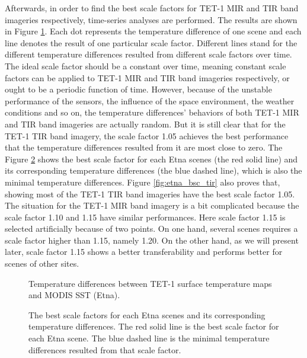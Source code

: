 \noindent Afterwards, in order to find the best scale factors for TET-1 MIR and TIR band imageries respectively, time-series analyses are performed. The results are shown in Figure \ref{fig:etna_sc_mir_tir}. Each dot represents the temperature difference of one scene and each line denotes the result of one particular scale factor. Different lines stand for the different temperature differences resulted from different scale factors over time. The ideal scale factor should be a constant over time, meaning constant scale factors can be applied to TET-1 MIR and TIR band imageries respectively, or ought to be a periodic function of time. However, because of the unstable performance of the sensors, the influence of the space environment, the weather conditions and so on, the temperature differences' behaviors of both TET-1 MIR and TIR band imageries are actually random. But it is still clear that for the TET-1 TIR band imagery, the scale factor 1.05 achieves the best performance that the temperature differences resulted from it are most close to zero. The Figure \ref{fig:etna_bsc_tem} shows the best scale factor for each Etna scenes (the red solid line) and its corresponding temperature differences (the blue dashed line), which is also the minimal temperature differences. Figure \ref{fig:etna_bsc_tir} also proves that, showing most of the TET-1 TIR band imageries have the best scale factor 1.05.\\

\noindent The situation for the TET-1 MIR band imagery is a bit complicated because the scale factor 1.10 and 1.15 have similar performances. Here scale factor 1.15 is selected artificially because of two points. On one hand, several scenes requires a scale factor higher than 1.15, namely 1.20. On the other hand, as we will present later, scale factor 1.15 shows a better transferability and performs better for scenes of other sites.\\

\begin{figure}[!htbp]
\centering
{}
\hspace{0.5in}
\caption{Temperature differences between TET-1 surface temperature maps and MODIS SST (Etna).}
\label{fig:etna_sc_mir_tir}
\end{figure}

\begin{figure}[!htbp]
\centering
{}
\hspace{0.5in}
\caption{The best scale factors for each Etna scenes and its corresponding temperature differences. The red solid line is the best scale factor for each Etna scene. The blue dashed line is the minimal temperature differences resulted from that scale factor.}
\label{fig:etna_bsc_tem}
\end{figure}

